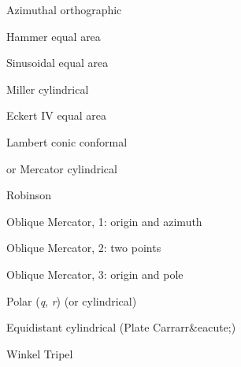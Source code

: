 \documentclass{article}
\begin{document}
\par 	{}	Azimuthal orthographic\par 

\par 	{}	Hammer equal area\par 

\par 	{}	Sinusoidal equal area\par 

\par 	{}	Miller cylindrical\par 

\par 	{}	Eckert IV equal area\par 

\par 	{}	Lambert conic conformal\par 

\par 	{}or{\it }	Mercator cylindrical\par 

\par 	{}	Robinson\par 

\par 	{}	Oblique Mercator, 1:	origin and azimuth\par 

\par 	{}	Oblique Mercator, 2:	two points\par 

\par 	{}	Oblique Mercator, 3:	origin and pole\par 

\par 	{}	Polar ({\it q}, {\it r}) (or cylindrical)\par 

\par 	{}	Equidistant cylindrical (Plate Carrarr\&eacute;)\par 

\par 	{}	Winkel Tripel\par 
\end{document}
